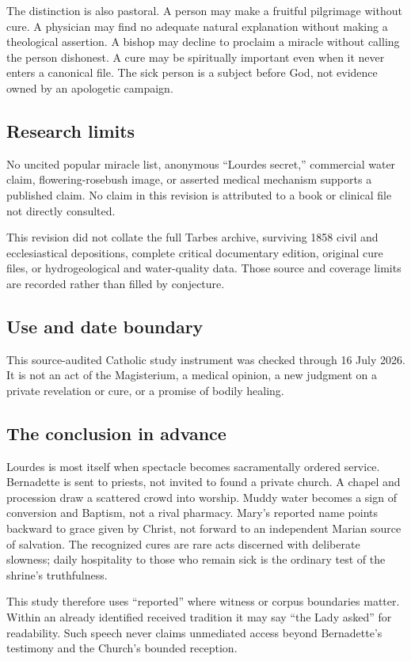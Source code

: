 {The distinction is also pastoral. A person may make a fruitful pilgrimage without cure. A physician may find no adequate natural explanation without making a theological assertion. A bishop may decline to proclaim a miracle without calling the person dishonest. A cure may be spiritually important even when it never enters a canonical file. The sick person is a subject before God, not evidence owned by an apologetic campaign.

\subsection{Research limits}

No uncited popular miracle list, anonymous “Lourdes secret,” commercial water claim, flowering-rosebush image, or asserted medical mechanism supports a published claim. No claim in this revision is attributed to a book or clinical file not directly consulted.

This revision did not collate the full Tarbes archive, surviving 1858 civil and ecclesiastical depositions, complete critical documentary edition, original cure files, or hydrogeological and water-quality data. Those source and coverage limits are recorded rather than filled by conjecture.

\subsection{Use and date boundary}

This source-audited Catholic study instrument was checked through 16 July 2026. It is not an act of the Magisterium, a medical opinion, a new judgment on a private revelation or cure, or a promise of bodily healing.
}

\subsection{The conclusion in advance}

Lourdes is most itself when spectacle becomes sacramentally ordered service. Bernadette is sent to priests, not invited to found a private church. A chapel and procession draw a scattered crowd into worship. Muddy water becomes a sign of conversion and Baptism, not a rival pharmacy. Mary's reported name points backward to grace given by Christ, not forward to an independent Marian source of salvation. The recognized cures are rare acts discerned with deliberate slowness; daily hospitality to those who remain sick is the ordinary test of the shrine's truthfulness.

This study therefore uses “reported” where witness or corpus boundaries matter. Within an already identified received tradition it may say “the Lady asked” for readability. Such speech never claims unmediated access beyond Bernadette's testimony and the Church's bounded reception.
